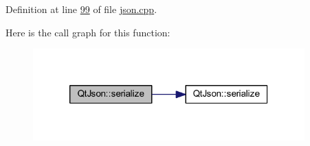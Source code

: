 Definition at line \hyperlink{json_8cpp_source_l00099}{99} of file \hyperlink{json_8cpp_source}{json.\-cpp}.



Here is the call graph for this function\-:\nopagebreak
\begin{figure}[H]
\begin{center}
\leavevmode
\includegraphics[width=296pt]{d2/d6d/namespace_qt_json_a1ff5b8ee653a95a99a35ccff4c347a4c_cgraph}
\end{center}
\end{figure}


